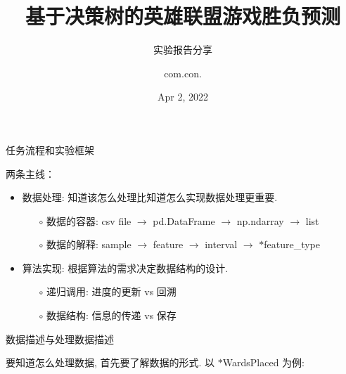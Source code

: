 



\begin{frame}
\title{基于决策树的英雄联盟游戏胜负预测}
\subtitle {实验报告分享}
\author{com.con.} %
\date{Apr 2, 2022}  %
\titlepage
\end{frame}

\begin{frame}{任务流程和实验框架}

两条主线：

\begin{itemize}
\item 数据处理: 知道该怎么处理比知道怎么实现数据处理更重要.
\begin{itemize}\setlength{\itemindent}{-1em}
\item[$\circ$] 数据的容器: csv file $\longrightarrow$ pd.DataFrame $\longrightarrow$ np.ndarray $\longrightarrow$ list
\item[$\circ$] 数据的解释: sample $\longrightarrow$ feature $\longrightarrow$ interval $\longrightarrow$ $*$feature\_type
\end{itemize}
\item 算法实现: 根据算法的需求决定数据结构的设计.
\begin{itemize}\setlength{\itemindent}{-1em}
\item[$\circ$] 递归调用: 进度的更新 vs 回溯
\item[$\circ$] 数据结构: 信息的传递 vs 保存
\end{itemize}
\end{itemize}

\end{frame}

\begin{frame}{数据描述与处理}{数据描述}

\vspace{-0.2cm}

要知道怎么处理数据, 首先要了解数据的形式. 以 $*$WardsPlaced 为例:

\begin{figure}[bth]
\end{figure}

\end{frame}

